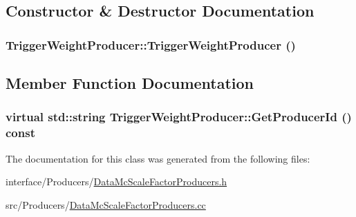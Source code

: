 \subsection{Constructor \& Destructor Documentation}
\hypertarget{classTriggerWeightProducer_af3a739fe500b608be0d9fd7112823d72}{
\subsubsection[{TriggerWeightProducer}]{\setlength{\rightskip}{0pt plus 5cm}TriggerWeightProducer::TriggerWeightProducer ()}}
\label{classTriggerWeightProducer_af3a739fe500b608be0d9fd7112823d72}


\subsection{Member Function Documentation}
\hypertarget{classTriggerWeightProducer_ae1c96224d40a0964c2ea992591a6310e}{
\subsubsection[{GetProducerId}]{\setlength{\rightskip}{0pt plus 5cm}virtual std::string TriggerWeightProducer::GetProducerId () const}}
\label{classTriggerWeightProducer_ae1c96224d40a0964c2ea992591a6310e}


The documentation for this class was generated from the following files:\begin{DoxyCompactItemize}
\item 
interface/Producers/\hyperlink{DataMcScaleFactorProducers_8h}{DataMcScaleFactorProducers.h}\item 
src/Producers/\hyperlink{DataMcScaleFactorProducers_8cc}{DataMcScaleFactorProducers.cc}\end{DoxyCompactItemize}
